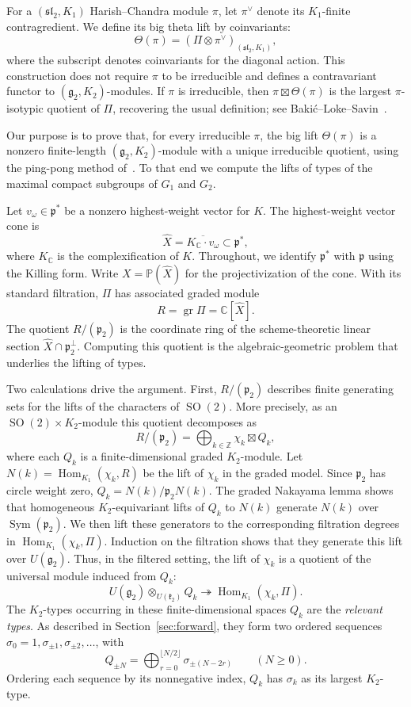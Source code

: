 \documentclass[11pt]{article}
\newcommand{\C}{\mathbb C}
\newcommand{\Z}{\mathbb Z}
\newcommand{\Sym}{\operatorname{Sym}}
\newcommand{\Hom}{\operatorname{Hom}}
\newcommand{\gr}{\operatorname{gr}}
\newcommand{\SO}{\operatorname{SO}}
\newcommand{\fg}{\mathfrak g}
\newcommand{\fk}{\mathfrak k}
\newcommand{\fp}{\mathfrak p}
\theoremstyle{definition}
\numberwithin{equation}{section}
\begin{document}
For a $(\mathfrak{sl}_2,K_1)$ Harish--Chandra module $\pi$, let
$\pi^\vee$ denote its $K_1$-finite contragredient. We define its big
theta lift by coinvariants:
\[
 \Theta(\pi)=(\Pi\otimes\pi^\vee)_{(\mathfrak{sl}_2,K_1)},
\]
where the subscript denotes coinvariants for the diagonal action.
This construction does not require $\pi$ to be irreducible and defines
a contravariant functor to $(\fg_2,K_2)$-modules. If $\pi$ is
irreducible, then $\pi\boxtimes\Theta(\pi)$ is the largest
$\pi$-isotypic quotient of $\Pi$, recovering the usual definition;
see Baki\'c--Loke--Savin~\cite{BLS25}.

Our purpose is to prove that, for every irreducible $\pi$, the big
lift $\Theta(\pi)$ is a nonzero finite-length $(\fg_2,K_2)$-module
with a unique irreducible quotient, using the ping-pong method
of~\cite{Savin}. To that end we compute the lifts of types of the
maximal compact subgroups of $G_1$ and $G_2$.

Let $v_\omega\in\fp^*$ be a nonzero highest-weight vector for $K$.
The highest-weight vector cone is
\[
 \widehat X=\overline{K_{\C}\cdot v_\omega}\subset\fp^*,
\]
where $K_{\C}$ is the complexification of $K$. Throughout, we identify
$\fp^*$ with $\fp$ using the Killing form. Write
$X=\mathbb P(\widehat X)$ for the projectivization of the cone. With its standard filtration, $\Pi$ has
associated graded module
\[
 R=\gr\Pi=\C[\widehat X].
\]
The quotient $R/(\fp_2)$ is the coordinate ring of the
scheme-theoretic linear section
$\widehat X\cap\fp_2^\perp$. Computing this quotient is the
algebraic-geometric problem that underlies the lifting of types.

Two calculations drive the argument. First, $R/(\fp_2)$ describes finite
generating sets for the lifts of the characters of $\SO(2)$. More precisely,
as an $\SO(2)\times K_2$-module this quotient decomposes as
\[
 R/(\fp_2)=\bigoplus_{k\in\Z}\chi_k\boxtimes Q_k,
\]
where each $Q_k$ is a finite-dimensional graded $K_2$-module. Let
$N(k)=\Hom_{K_1}(\chi_k,R)$ be the lift of $\chi_k$ in the graded model.
Since $\fp_2$ has circle weight zero, $Q_k=N(k)/\fp_2N(k)$.
The graded Nakayama lemma shows that homogeneous $K_2$-equivariant
lifts of $Q_k$ to $N(k)$ generate $N(k)$ over $\Sym(\fp_2)$.
We then lift these generators to the corresponding filtration degrees
in $\Hom_{K_1}(\chi_k,\Pi)$. Induction on the filtration shows that
they generate this lift over $U(\fg_2)$. Thus, in the filtered setting,
the lift of $\chi_k$ is a quotient of the universal module induced from
$Q_k$:
\[
 U(\fg_2)\otimes_{U(\fk_2)}Q_k
   \twoheadrightarrow\Hom_{K_1}(\chi_k,\Pi).
\]
The $K_2$-types occurring in these finite-dimensional spaces $Q_k$ are
the \emph{relevant types}. As described in Section~\ref{sec:forward},
they form two ordered sequences $\sigma_0=1,\sigma_{\pm1},
\sigma_{\pm2},\ldots$, with
\[
 Q_{\pm N}=\bigoplus_{r=0}^{\lfloor N/2\rfloor}
                  \sigma_{\pm(N-2r)}\qquad(N\geq0).
\]
Ordering each sequence by its nonnegative index, $Q_k$ has $\sigma_k$
as its largest $K_2$-type.
\end{document}

